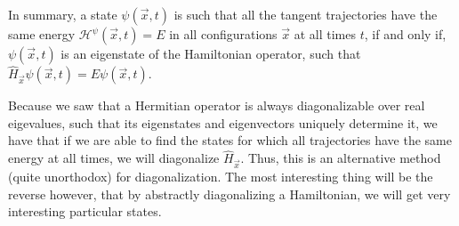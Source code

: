 \documentclass[11pt, a4paper]{article} %
\newcommand{\h}{\mathcal{H}}
\begin{document}
In summary, a state $\psi(\vec{x},t)$ is such that all the tangent trajectories have the same energy $\h^\psi(\vec{x},t)=E$ in all configurations $\vec{x}$ at all times $t$, if and only if, $\psi(\vec{x},t)$ is an eigenstate of the Hamiltonian operator, such that $\hat{H}_{\vec{x}}\psi(\vec{x},t)=E\psi(\vec{x},t)$.

Because we saw that a Hermitian operator is always diagonalizable over real eigevalues, such that its eigenstates and eigenvectors uniquely determine it, we have that if we are able to find the states for which all trajectories have the same energy at all times, we will diagonalize $\hat{H}_{\vec{x}}$. Thus, this is an alternative method (quite unorthodox) for diagonalization. The most interesting thing will be the reverse however, that by abstractly diagonalizing a Hamiltonian, we will get very interesting particular states. 
\end{document}
